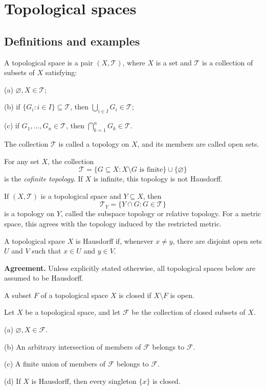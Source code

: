 \section{Topological spaces}

\subsection{Definitions and examples}

\begin{de}
A topological space is a pair $(X,\mathcal{T})$, where $X$ is a set and
$\mathcal{T}$ is a collection of subsets of $X$ satisfying:

(a) $\varnothing,X\in\mathcal{T}$;

(b) if $\{G_i:i\in I\}\subseteq\mathcal{T}$, then
$\bigcup_{i\in I}G_i\in\mathcal{T}$;

(c) if $G_1,\ldots,G_n\in\mathcal{T}$, then
$\bigcap_{k=1}^nG_k\in\mathcal{T}$.

The collection $\mathcal{T}$ is called a topology on $X$, and its members are
called open sets.

For any set $X$, the collection
\[
\mathcal{T}=\{G\subseteq X:X\setminus G\text{ is finite}\}\cup\{\varnothing\}
\]
is the \emph{cofinite topology}. If $X$ is infinite, this topology is not
Hausdorff.

If $(X,\mathcal{T})$ is a topological space and $Y\subseteq X$, then
\[
\mathcal{T}_Y=\{Y\cap G:G\in\mathcal{T}\}
\]
is a topology on $Y$, called the subspace topology or relative topology. For
a metric space, this agrees with the topology induced by the restricted
metric.

A topological space $X$ is Hausdorff if, whenever $x\neq y$, there are
disjoint open sets $U$ and $V$ such that $x\in U$ and $y\in V$.
\end{de}

\textbf{Agreement.} Unless explicitly stated otherwise, all topological
spaces below are assumed to be Hausdorff.

A subset $F$ of a topological space $X$ is closed if $X\setminus F$ is open.

\begin{thm}
Let $X$ be a topological space, and let $\mathcal{F}$ be the collection of
closed subsets of $X$.

(a) $\varnothing,X\in\mathcal{F}$.

(b) An arbitrary intersection of members of $\mathcal{F}$ belongs to
$\mathcal{F}$.

(c) A finite union of members of $\mathcal{F}$ belongs to $\mathcal{F}$.

(d) If $X$ is Hausdorff, then every singleton $\{x\}$ is closed.
\end{thm}

